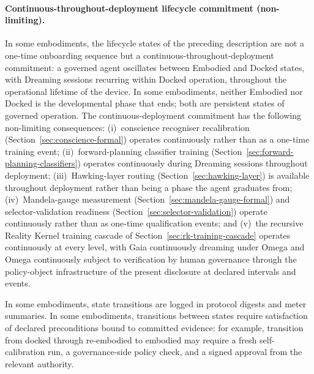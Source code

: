 \documentclass[a4paper,12pt]{article}
\newcommand{\RK}{Reality Kernel\xspace}
\begin{document}
\paragraph{Continuous-throughout-deployment lifecycle commitment
(non-limiting).}
In some embodiments, the lifecycle states of the preceding
description are not a one-time onboarding sequence but a
continuous-throughout-deployment commitment: a governed agent
oscillates between Embodied and Docked states, with Dreaming sessions
recurring within Docked operation, throughout the operational lifetime
of the device. In some embodiments, neither Embodied nor Docked is
the developmental phase that ends; both are persistent states of
governed operation. The continuous-deployment commitment has the
following non-limiting consequences: (i)~conscience recogniser
recalibration (Section~\ref{sec:conscience-formal}) operates
continuously rather than as a one-time training event;
(ii)~forward-planning classifier training
(Section~\ref{sec:forward-planning-classifiers}) operates continuously
during Dreaming sessions throughout deployment;
(iii)~Hawking-layer routing (Section~\ref{sec:hawking-layer}) is
available throughout deployment rather than being a phase the agent
graduates from; (iv)~Mandela-gauge measurement
(Section~\ref{sec:mandela-gauge-formal}) and selector-validation
readiness (Section~\ref{sec:selector-validation}) operate
continuously rather than as one-time qualification events; and
(v)~the recursive \RK training cascade of
Section~\ref{sec:rk-training-cascade} operates continuously at every
level, with Gaia continuously dreaming under Omega and Omega
continuously subject to verification by human governance through the
policy-object infrastructure of the present disclosure at declared
intervals and events.

In some embodiments, state transitions are logged in protocol digests
and meter summaries. In some embodiments, transitions between states
require satisfaction of declared preconditions bound to committed
evidence: for example, transition from docked through re-embodied to
embodied may require a fresh self-calibration run, a governance-side
policy check, and a signed approval from the relevant authority.
\end{document}
